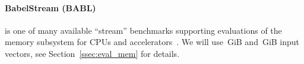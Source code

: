 \paragraph{BabelStream (BABL)} is one of many available ``stream'' benchmarks supporting
evaluations of the memory subsystem for CPUs and accelerators~\cite{deakin_gpu-stream_2016}.
We will use~\unit[2]{GiB} and~\unit[14]{GiB} input vectors, see Section~\ref{ssec:eval_mem}
for details.

%
%
%
%
%
%
%

